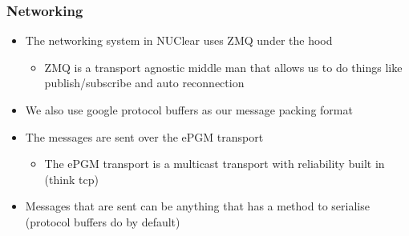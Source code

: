 \documentclass{beamer}
\begin{document}
\begin{frame}
	\frametitle{Networking}
	\begin{itemize}
		\item The networking system in NUClear uses ZMQ under the hood
		\begin{itemize}
			\item ZMQ is a transport agnostic middle man that allows us to do things like publish/subscribe and auto reconnection
		\end{itemize}
		\item We also use google protocol buffers as our message packing format
		\item The messages are sent over the ePGM transport
		\begin{itemize}
			\item The ePGM transport is a multicast transport with reliability built in (think tcp)
		\end{itemize}
		\item Messages that are sent can be anything that has a method to serialise (protocol buffers do by default)
	\end{itemize}
\end{frame}
\end{document}
